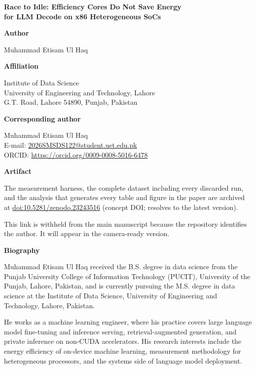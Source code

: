 \documentclass[11pt]{article}
\begin{document}
\begin{center}
{\Large\bfseries Race to Idle: Efficiency Cores Do Not Save Energy\\[2pt]
for LLM Decode on x86 Heterogeneous SoCs}
\end{center}

\vspace{1.5em}
\noindent\textbf{Author}

\noindent Muhammad Etisam Ul Haq

\vspace{0.8em}
\noindent\textbf{Affiliation}

\noindent Institute of Data Science\\
University of Engineering and Technology, Lahore\\
G.T. Road, Lahore 54890, Punjab, Pakistan

\vspace{0.8em}
\noindent\textbf{Corresponding author}

\noindent Muhammad Etisam Ul Haq\\
E-mail: \href{mailto:2026SMSDS122@student.uet.edu.pk}{2026SMSDS122@student.uet.edu.pk}\\
ORCID: \url{https://orcid.org/0009-0008-5016-6478}

\vspace{0.8em}
\noindent\textbf{Artifact}

\noindent The measurement harness, the complete dataset including every
discarded run, and the analysis that generates every table and figure in the
paper are archived at
\href{https://doi.org/10.5281/zenodo.23243516}{doi:10.5281/zenodo.23243516}
(concept DOI; resolves to the latest version).

\noindent This link is withheld from the main manuscript because the
repository identifies the author. It will appear in the camera-ready version.

\vspace{0.8em}
\noindent\textbf{Biography}

\noindent Muhammad Etisam Ul Haq received the B.S. degree in data science from
the Punjab University College of Information Technology (PUCIT), University of
the Punjab, Lahore, Pakistan, and is currently pursuing the M.S. degree in data
science at the Institute of Data Science, University of Engineering and
Technology, Lahore, Pakistan.

\noindent He works as a machine learning engineer, where his practice covers
large language model fine-tuning and inference serving, retrieval-augmented
generation, and private inference on non-CUDA accelerators. His research
interests include the energy efficiency of on-device machine learning,
measurement methodology for heterogeneous processors, and the systems side of
language model deployment.
\end{document}
